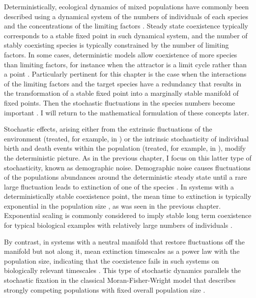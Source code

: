 
Deterministically, ecological dynamics of mixed populations have commonly been described using a dynamical system of the numbers of individuals of each species and the concentrations of the limiting factors \cite{Armstrong1976,McGehee1977a,Armstrong1980}. 
Steady state coexistence typically corresponds to a stable fixed point in such dynamical system, and the number of stably coexisting species is typically constrained by the number of limiting factors. 
In some cases, deterministic models allow coexistence of more species than limiting factors, for instance when the attractor is a limit cycle rather than a point \cite{Smale1976,Armstrong1980}. 
Particularly pertinent for this chapter is the case when the interactions of the limiting factors and the target species have a redundancy that results in the transformation of a stable fixed point into a marginally stable manifold of fixed points. 
Then the stochastic fluctuations in the species numbers become important \cite{Volterra1926,Armstrong1980,Bomze1983,Chesson1990,Antal2006,Posfai2017}. 
I will return to the mathematical formulation of these concepts later. %

Stochastic effects, arising either from the extrinsic fluctuations of the environment (treated, for example, in \cite{Kamenev2008a,Chotibut2017a}) or the intrinsic stochasticity of individual birth and death events within the population (treated, for example, in \cite{Assaf2006,Gottesman2012,Dobrinevski2012,Gabel2013,Fisher2014,Constable2015,Lin2012,Chotibut2015,Young2018}), modify the deterministic picture. 
As in the previous chapter, I focus on this latter type of stochasticity, known as demographic noise. 
Demographic noise causes fluctuations of the populations abundances around the deterministic steady state until a rare large fluctuation leads to extinction of one of the species \cite{Kimura1968,Lin2012,Chotibut2015}. 
In systems with a deterministically stable coexistence point, the mean time to extinction is typically exponential in the population size \cite{Norden1982,Kamenev2008,Assaf2010,Ovaskainen2010}, as was seen in the previous chapter. 
Exponential scaling is commonly considered to imply stable long term coexistence for typical biological examples with relatively large numbers of individuals \cite{Ovaskainen2010,Lin2015}. 

By contrast, in systems with a neutral manifold that restore fluctuations off the manifold but not along it, mean extinction timescales as a power law with the population size, indicating that the coexistence fails in such systems on biologically relevant timescales \cite{Kimura1955,Moran1962,Lin2012,Chotibut2017a}. 
This type of stochastic dynamics parallels the stochastic fixation in the classical Moran-Fisher-Wright model that describes strongly competing populations with fixed overall population size \cite{Wright1931,Fisher1930,Moran1962,Kimura1968,Rice2004,Rogers2014,Stirk2010,Capitan2017}.


